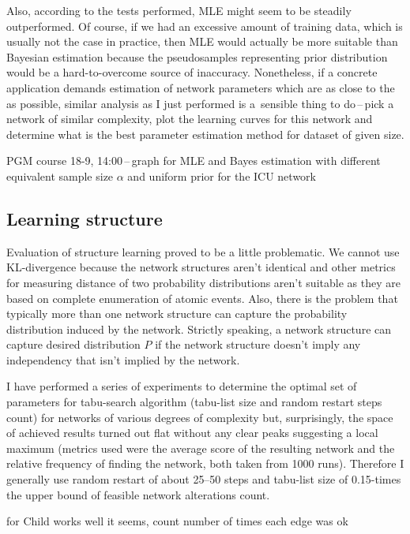 \documentclass[english,cover]{fitthesis} %
\newcommand{\todo}[1]{{\color{red}#1}}
\begin{document}
Also, according to the tests performed, MLE might seem to be steadily outperformed. Of course, if we had an excessive amount of training data, which is usually not the case in practice, then MLE would actually be more suitable than Bayesian estimation because the pseudosamples representing prior distribution would be a hard-to-overcome source of inaccuracy. Nonetheless, if a concrete application demands estimation of network parameters which are as close to the  as possible, similar analysis as I just performed is a~sensible thing to do\,--\,pick a network of similar complexity, plot the learning curves for this network and determine what is the best parameter estimation method for dataset of given size.

\todo{PGM course 18-9, 14:00\,--\,graph for MLE and Bayes estimation with different equivalent sample size $\alpha$ and uniform prior for the ICU network}


\subsection{Learning structure}
Evaluation of structure learning proved to be a little problematic. We cannot use KL-divergence because the network structures aren't identical and other metrics for measuring distance of two probability distributions aren't suitable as they are based on complete enumeration of atomic events. Also, there is the problem that typically more than one network structure can capture the probability distribution induced by the  network. Strictly speaking, a network structure can capture desired distribution $P$ if the network structure doesn't imply any independency that isn't implied by the  network.

I have performed a series of experiments to determine the optimal set of parameters for tabu-search algorithm (tabu-list size and random restart steps count) for networks of various degrees of complexity but, surprisingly, the space of achieved results turned out flat without any clear peaks suggesting a local maximum (metrics used were the average score of the resulting network and the relative frequency of finding the  network, both taken from 1000 runs). Therefore I generally use random restart of about 25--50 steps and tabu-list size of 0.15-times the upper bound of feasible network alterations count.

\todo{for Child works well it seems, count number of times each edge was ok}
\end{document}

